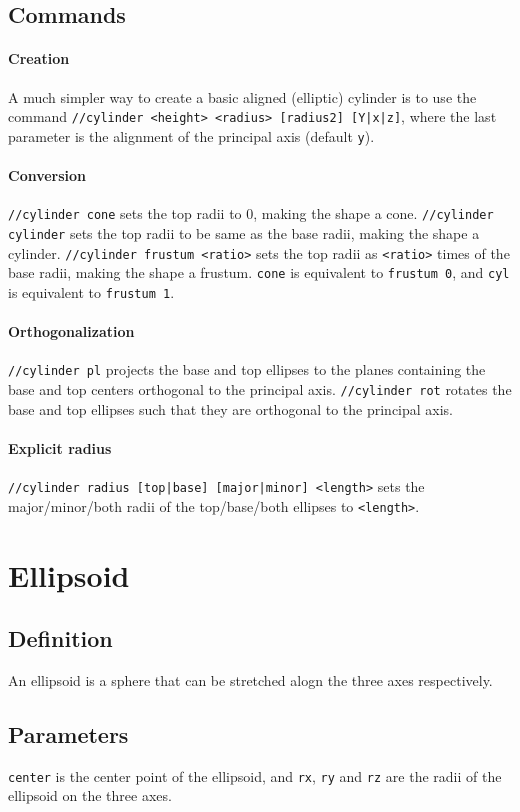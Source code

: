 \documentclass{report}
\begin{document}
				\subsection{Commands}
					\paragraph{Creation} A much simpler way to create a basic aligned (elliptic) cylinder is to use the
					command \texttt{//cylinder <height> <radius> [radius2] [Y|x|z]}, where the last parameter is the
					alignment of the principal axis (default \texttt{y}).
					\paragraph{Conversion} \texttt{//cylinder cone} sets the top radii to 0, making the shape a cone.
					\texttt{//cylinder cylinder} sets the top radii to be same as the base radii, making the shape a
					cylinder. \texttt{//cylinder frustum <ratio>} sets the top radii as \texttt{<ratio>} times of the
					base radii, making the shape a frustum. \texttt{cone} is equivalent to \texttt{frustum 0}, and
					\texttt{cyl} is equivalent to \texttt{frustum 1}.
					\paragraph{Orthogonalization} \texttt{//cylinder pl} projects the base and top ellipses to the
					planes containing the base and top centers orthogonal to the principal axis. \texttt{//cylinder rot}
					rotates the base and top ellipses such that they are orthogonal to the principal axis.
					\paragraph{Explicit radius} \texttt{//cylinder radius [top|base] [major|minor] <length>} sets the
					major/minor/both radii of the top/base/both ellipses to \texttt{<length>}.

			\section{Ellipsoid}
				\subsection{Definition} An ellipsoid is a sphere that can be stretched alogn the three axes respectively.
				\subsection{Parameters} \texttt{center} is the center point of the ellipsoid, and \texttt{rx},
				\texttt{ry} and \texttt{rz} are the radii of the ellipsoid on the three axes.
\end{document}
